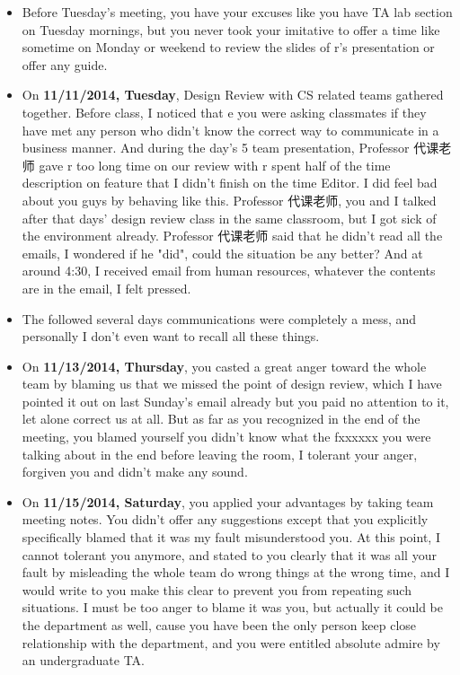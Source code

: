 \documentclass[12pt]{book}
\begin{document}
\begin{itemize}
\item Before Tuesday's meeting, you have your excuses like you have TA lab section on Tuesday mornings, but you never took your imitative to offer a time like sometime on Monday or weekend to review the slides of r's presentation or offer any guide.

\item On \textbf{11/11/2014, Tuesday}, Design Review with CS related teams gathered together. Before class, I noticed that e you were asking classmates if they have met any person who didn't know the correct way to communicate in a business manner. And during the day's 5 team presentation, Professor 代课老师 gave r too long time on our review with r spent half of the time description on feature that I didn't finish on the time Editor. I did feel bad about you guys by behaving like this. Professor 代课老师, you and I talked after that days' design review class in the same classroom, but I got sick of the environment already. Professor 代课老师 said that he didn't read all the emails, I wondered if he "did", could the situation be any better? And at around 4:30, I received email from human resources, whatever the contents are in the email, I felt pressed.

\item The followed several days communications were completely a mess, and personally I don't even want to recall all these things.

\item On \textbf{11/13/2014, Thursday}, you casted a great anger toward the whole team by blaming us that we missed the point of design review, which I have pointed it out on last Sunday's email already but you paid no attention to it, let alone correct us at all. But as far as you recognized in the end of the meeting, you blamed yourself you didn't know what the fxxxxxx you were talking about in the end before leaving the room, I tolerant your anger, forgiven you and didn't make any sound.

\item On \textbf{11/15/2014, Saturday}, you applied your advantages by taking team meeting notes. You didn't offer any suggestions except that you explicitly specifically blamed that it was my fault misunderstood you. At this point, I cannot tolerant you anymore, and stated to you clearly that it was all your fault by misleading the whole team do wrong things at the wrong time, and I would write to you make this clear to prevent you from repeating such situations. I must be too anger to blame it was you, but actually it could be the department as well, cause you have been the only person keep close relationship with the department, and you were entitled absolute admire by an undergraduate TA.
\end{itemize}
\end{document}
